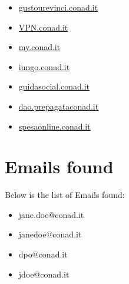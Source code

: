 \documentclass{article}
\begin{document}
\begin{itemize}
        \item \href{ http://gustourevinci.conad.it/vincitori2020/gustourevinci.htm }{ gustourevinci.conad.it }
    
        
        
        \item \href{ http://VPN.conad.it }{ VPN.conad.it }
    
        
        
        \item \href{ https://my.conad.it/login.html?cb=https:/vincinatale.conad.it }{ my.conad.it }
    
        
        
        \item \href{ http://iungo.conad.it }{ iungo.conad.it }
    
        
        
        \item \href{ https://guidasocial.conad.it/ }{ guidasocial.conad.it }
    
        
        
        \item \href{ https://dao.prepagataconad.it/ }{ dao.prepagataconad.it }
    
        
        
        \item \href{ https://spesaonline.conad.it/order?bEcommerce=sap\&orderId=o-s-N-23-03667190 }{ spesaonline.conad.it }
    
\end{itemize}


\section*{Emails found}

Below is the list of Emails found:

\begin{itemize}
    
        \item jane.doe@conad.it
    
        \item janedoe@conad.it
    
        \item dpo@conad.it
    
        \item jdoe@conad.it
    
\end{itemize}
\end{document}
